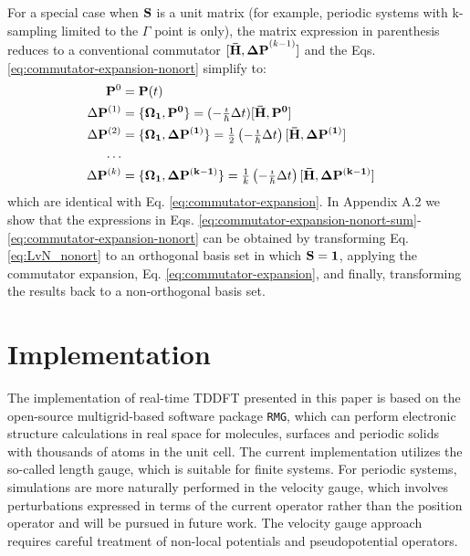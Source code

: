 \documentclass[journal=jctcce,manuscript=article,etalmode=truncate,maxauthors=10,layout=twocolumn,9pt]{achemso}   %
\begin{document}
 For  a special case when  $\vb{S}$ is a unit matrix (for example, periodic systems 
with k-sampling limited to the $\Gamma$  point is only), 
 the matrix expression in parenthesis reduces to a  conventional commutator $[\vb{\bar H, \Delta P}^{(k-1)}]$ 
and  the  Eqs. \ref{eq:commutator-expansion-nonort} simplify to:
\begin{align}
\nonumber       \vb{P}^0  &=  \vb{P}(t) \\
\nonumber \Delta \vb{P}^{(1)} &=  \vb{  \{ \Omega_1, P^0 \} } 
   = ( -\tfrac{\imath}{\hbar} \Delta t ) \vb{   [\bar{H} , P^0 ]  } \\
\nonumber \Delta \vb{P}^{(2)} &=  \vb{  \{ \Omega_1,\Delta  P^{(1)} \} }  
   = \tfrac{1}{2}  \left(  -\tfrac{\imath}{\hbar} \Delta t\right) \vb{  [ \bar{H}, \Delta P^{(1)}]   } \\
\nonumber  \ldots& &\\
\Delta \vb{P}^{(k)} &=  \vb{  \{ \Omega_1,\Delta  P^{(k-1)} \} }  
   = \tfrac{1}{k}  \left(  -\tfrac{\imath}{\hbar} \Delta t\right) \vb{[ \bar{H}, \Delta P^{(k-1)} ]}    
\label{eq:commutator-expansion-ort}
\end{align}
which are  identical  with  Eq. \ref{eq:commutator-expansion}.
In Appendix A.2  we  show  that the expressions  in
 Eqs. \ref{eq:commutator-expansion-nonort-sum}-\ref{eq:commutator-expansion-nonort}  
can be obtained by transforming Eq. \ref{eq:LvN_nonort} to an orthogonal basis set in which  $\vb{S=1}$,  
applying the commutator expansion, Eq. \ref{eq:commutator-expansion}, 
and  finally, transforming the results back to a non-orthogonal basis set.


\section{Implementation}
\label{sec:implementation}


The implementation of real-time TDDFT presented in this paper is based on the open-source multigrid-based software package \texttt{RMG}, which can perform electronic structure calculations in real space for molecules, surfaces and periodic solids with thousands of atoms in the unit cell. 
The current implementation utilizes the so-called length gauge, which is suitable for finite systems. For periodic systems, simulations are more naturally performed in the velocity gauge, which involves perturbations expressed in terms of the current operator rather than the position operator\cite{periodic-operator} and will be pursued in future work. The velocity gauge approach  requires careful treatment of non-local potentials and pseudopotential operators.\cite{Luber-rt-tddft} 
\end{document}
